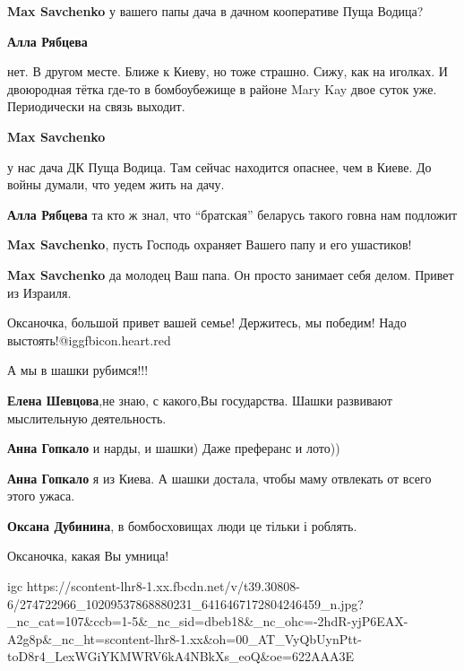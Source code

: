 \begin{itemize}
\textbf{Max Savchenko} у вашего папы дача в дачном кооперативе Пуща Водица?

\begin{itemize} %
\textbf{Алла Рябцева} 

нет. В другом месте. Ближе к Киеву, но тоже страшно. Сижу, как на иголках. И
двоюродная тётка где-то в бомбоубежище в районе Mary Kay двое суток уже.
Периодически на связь выходит.

\textbf{Max Savchenko} 

у нас дача ДК Пуща Водица. Там сейчас находится опаснее, чем в Киеве. До войны
думали, что уедем жить на дачу.

\textbf{Алла Рябцева} та кто ж знал, что \enquote{братская} беларусь такого говна нам подложит
\end{itemize} %

\textbf{Max Savchenko}, пусть Господь охраняет Вашего папу и его ушастиков!

\textbf{Max Savchenko} да молодец Ваш папа. Он просто занимает себя делом. Привет из Израиля.

\end{itemize} %


Оксаночка, большой привет вашей семье! Держитесь, мы победим! Надо
выстоять!@igg{fbicon.heart.red}

А мы в шашки рубимся!!!

\begin{itemize} %
\textbf{Елена Шевцова},не знаю, с какого,Вы государства. Шашки развивают мыслительную деятельность.

\textbf{Анна Гопкало} и нарды, и шашки) Даже преферанс и лото))

\textbf{Анна Гопкало} я из Киева. А шашки достала, чтобы маму отвлекать от всего этого ужаса.

\textbf{Оксана Дубинина}, в бомбосховищах люди це тільки і роблять.
\end{itemize} %

Оксаночка, какая Вы умница!


\ifcmt
  igc https://scontent-lhr8-1.xx.fbcdn.net/v/t39.30808-6/274722966_10209537868880231_6416467172804246459_n.jpg?_nc_cat=107&ccb=1-5&_nc_sid=dbeb18&_nc_ohc=-2hdR-yjP6EAX-A2g8p&_nc_ht=scontent-lhr8-1.xx&oh=00_AT_VyQbUynPtt-toD8r4_LexWGiYKMWRV6kA4NBkXs_eoQ&oe=622AAA3E
\fi

